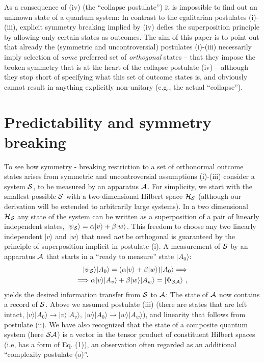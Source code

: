 \documentclass[aps,twocolumn,pra,onecolumn,12pt]{revtex4}
\newcommand{\ket}[1]    {| #1 \rangle}
\newcommand{\+}         {\dagger}
\begin{document}
As a consequence of (iv) (the ``collapse postulate'') it is impossible to find out an unknown state of a quantum system: In contrast to the egalitarian postulates (i)-(iii), explicit symmetry breaking implied by (iv) defies the superposition principle by allowing only certain states as outcomes. 
The aim of this paper is to point out that already the (symmetric and uncontroversial) postulates (i)-(iii) necessarily imply selection of  {\it some} preferred set of {\it orthogonal} states -- that they impose the broken symmetry that is at the heart of the collapse postulate (iv) -- although they stop short of specifying what this set of outcome states is, and obviously cannot result in anything explicitly non-unitary 
(e.g., the actual ``collapse''). 

 \section{Predictability and symmetry breaking}

To see how symmetry - breaking restriction to a set of orthonormal outcome states arises from 
symmetric and uncontroversial assumptions (i)-(iii) consider a system ${\cal S}$, to be 
measured by an apparatus ${\cal A}$. For simplicity, we start with the smallest possible ${\cal S}$ 
with a two-dimensional Hilbert space ${\cal H}_{\cal S}$ (although our derivation will be extended to arbitrarily large systems). In a two dimensional ${\cal H}_{\cal S}$ any state of the system can be written as a superposition of a pair of linearly independent states, $\ket {\psi_{\cal S}} = \alpha \ket v + \beta \ket w $. This freedom to choose any two linearly independent $\ket v$ and $\ket w$ that need {\it not} be orthogonal is guaranteed by the principle of superposition implicit in postulate (i). A measurement of ${\cal S}$ by an apparatus ${\cal A}$ that starts in a ``ready to measure'' state $\ket {A_0}$:
\begin{eqnarray}
\ket {\psi_{\cal S}}\ket {A_0}=( \alpha \ket v + \beta \ket w )\ket {A_0} \Longrightarrow \nonumber \\
 \Longrightarrow \alpha \ket v \ket {A_v}+ \beta \ket w \ket {A_w} = \ket {\Phi_{\cal SA}} \ ,
\end{eqnarray}
yields the desired information transfer from ${\cal S}$ to ${\cal A}$: The state of ${\cal A}$ now contains a record of ${\cal S}$. 
Above we assumed postulate (iii) (there are states that are left intact, $ \ket v \ket {A_0} \rightarrow \ket v \ket {A_v}, \ \ket w \ket {A_0} \rightarrow \ket w \ket {A_w} $),
and  linearity that follows from postulate (ii). We have also recognized that the state of a composite quantum system (here ${\cal SA}$) is a vector in the tensor product of constituent Hilbert spaces (i.e, has a form of Eq. (1)), an observation often regarded as an additional ``complexity postulate (o)''. 
\end{document}
